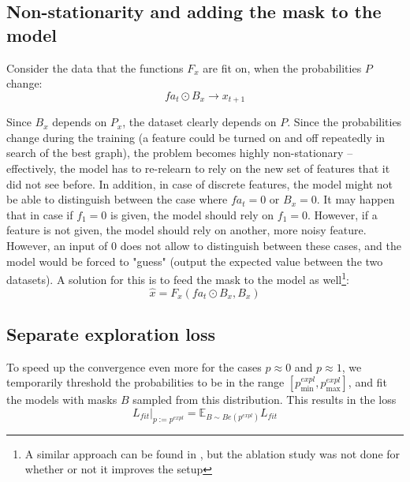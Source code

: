 \documentclass[a4paper,11pt,oneside]{report}
\begin{document}
\subsection{Non-stationarity and adding the mask to the model}
Consider the data that the functions $F_x$ are fit on, when the probabilities $P$ change:
$$
fa_t\odot B_x\to x_{t+1}
$$

Since $B_x$ depends on $P_x$, the dataset clearly depends on $P$. Since the probabilities change during the training (a feature could be turned on and off repeatedly in search of the best graph), the problem becomes highly non-stationary -- effectively, the model has to re-relearn to rely on the new set of features that it did not see before. In addition, in case of discrete features, the model might not be able to distinguish between the case where $fa_t=0$ or $B_x=0$.
It may happen that in case if $f_1=0$ is given, the model should rely on $f_1=0$. However, if a feature is not given, the model should rely on another, more noisy feature.
However, an input of $0$ does not allow to distinguish between these cases, and the model would be forced to "guess" (output the expected value between the two datasets).
A solution for this is to feed the mask to the model as well\footnote{A similar approach can be found in \cite{Mooij2016}, but the ablation study was not done for whether or not it improves the setup}:
$$
\hat{x}=F_x(fa_t\odot B_x,B_x)
$$

\subsection{Separate exploration loss}
To speed up the convergence even more for the cases $p\approx 0$ and $p\approx 1$, we temporarily threshold the probabilities to be in the range $[p^{expl}_{\min},p^{expl}_{\max}]$, and fit the models with masks $B$ sampled from this distribution. This results in the loss
\begin{equation}
L_{fit}\big|_{p:=p^{expl}}=\mathbb E_{B\sim Be(p^{expl})} L_{fit}
\end{equation}
\end{document}
